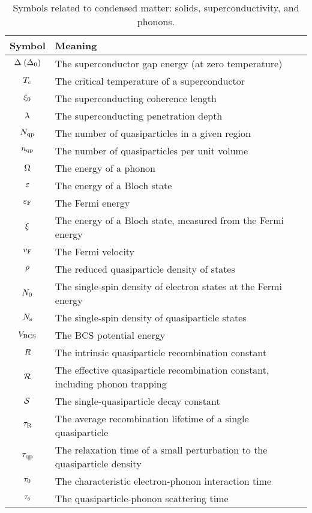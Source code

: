 \begin{table}[tb]
\centering
\caption
{Symbols related to condensed matter: solids, superconductivity, and phonons.}
\renewcommand{\arraystretch}{1.2}
\begin{tabular}{c l}
\toprule
Symbol & Meaning \\
\midrule
$\Delta \; (\Delta_0)$ & The superconductor gap energy (at zero temperature) \\
$T_{\mathrm{c}}$ & The critical temperature of a superconductor \\
$\xi_0$ & The superconducting coherence length \\
$\lambda$ & The superconducting penetration depth \\
$N_{\mathrm{qp}}$ & The number of quasiparticles in a given region  \\
$n_{\mathrm{qp}}$ & The number of quasiparticles per unit volume \\
$\Omega$ & The energy of a phonon \\
$\varepsilon$ & The energy of a Bloch state \\
$\varepsilon_{\mathrm{F}}$ & The Fermi energy \\
$\xi$ & The energy of a Bloch state, measured from the Fermi energy \\
$v_{\mathrm{F}}$ & The Fermi velocity \\
$\rho$ & The reduced quasiparticle density of states \\
$N_0$ & The single-spin density of electron states at the Fermi energy \\
$N_\mathrm{s}$ & The single-spin density of quasiparticle states \\
$V_\mathrm{BCS}$ & The BCS potential energy \\
$R$ & The intrinsic quasiparticle recombination constant \\
$\mathcal{R}$ & The effective quasiparticle recombination constant, including phonon trapping \\
$\mathcal{S}$ & The single-quasiparticle decay constant \\
$\tau_\mathrm{R}$ & The average recombination lifetime of a single quasiparticle \\
$\tau_{\mathrm{qp}}$ & The relaxation time of a small perturbation to the quasiparticle density \\
$\tau_0$ & The characteristic electron-phonon interaction time \\
$\tau_\mathrm{s}$ & The quasiparticle-phonon scattering time \\

\end{tabular}
\end{table}
